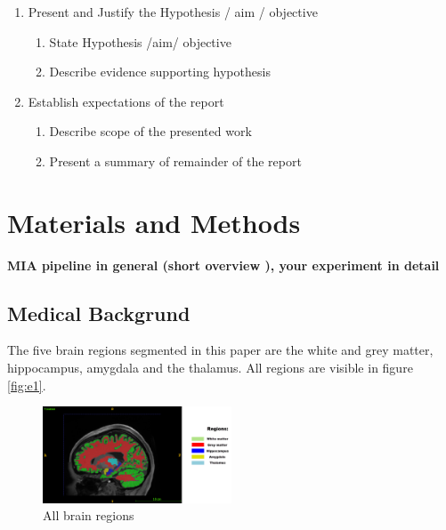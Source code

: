 \documentclass[journal]{IEEEtran}
\begin{document}
{\begin{enumerate}
		\begin{enumerate}
		\item Explain what is the state of the art / current practice
		\item Explain what preliminary / related work has been done towards solving the problem by you and others
		\item Explain what deficiencies / problems still exist (specifically the one that you will try to address)
		\end{enumerate}
	\item Present and Justify the Hypothesis / aim / objective
		\begin{enumerate}
		\item State Hypothesis /aim/ objective
		\item Describe evidence supporting hypothesis
		\end{enumerate}
	\item Establish expectations of the report
		\begin{enumerate}
		\item Describe scope of the presented work
		\item Present a summary of remainder of the report\\
		\end{enumerate}
	\end{enumerate} 
}



\section{Materials and Methods}
\textbf{MIA pipeline in general (short overview ), your experiment in detail}
\subsection{Medical Backgrund}
	The five brain regions segmented in this paper are the white and grey matter, hippocampus, amygdala and the thalamus. All regions are visible in figure \ref{fig:e1}.

	\begin{figure}[h]
		\centering
		\includegraphics[width=0.5\textwidth]{T1native_all_regions_labelled.png}
		\caption{All brain regions}
		\label{fig:figure1}
	\end{figure}
\end{document}
